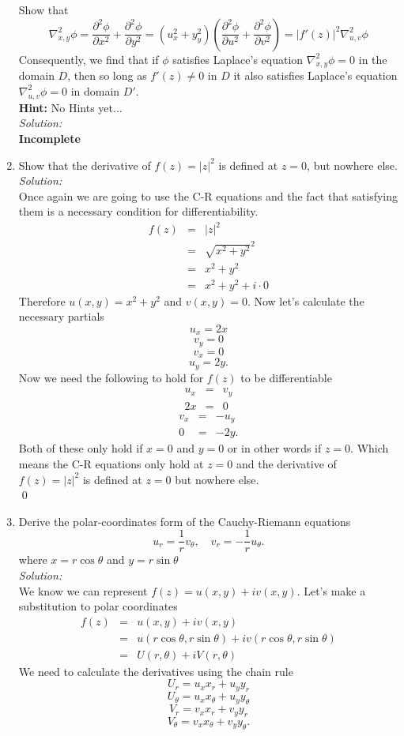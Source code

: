 \documentclass[10pt]{amsart}
\theoremstyle{nonumberplain}
\begin{document}
\begin{enumerate}[label={\bf {\arabic*}:}]
Show that
$$
\nabla_{x, y}^2 \phi = 
\frac{\partial^2\phi}{\partial x^2} + \frac{\partial^2 \phi }{\partial y^2} = 
\left(u_x^2 + y_y^2\right) \left(\frac{\partial^2\phi}{\partial u^2} + \frac{\partial^2 \phi }{\partial v^2}\right) =
\left| f'(z)\right|^2 \nabla_{u, v}^2 \phi
$$
Consequently, we find that if $\phi$ satisfies Laplace's equation $\nabla_{x, y}^2 \phi = 0$ in the domain $D$,
then so long as $f'(z) \neq 0$ in $D$ it also satisfies Laplace's equation $\nabla_{u, v}^2 \phi = 0$ in domain $D'$. \\
\textbf{Hint:} No Hints yet... \\
\textit{Solution:} \\
\textbf{Incomplete} \\
\item Show that the derivative of $f(z)=|z|^2$ is defined at $z=0$, but nowhere else.\\
\textit{Solution:} \\
Once again we are going to use the C-R equations and the fact that satisfying them is a necessary condition for differentiability.
\begin{eqnarray*}
f(z) &=&|z|^2 \\
      &=&\sqrt{x^2 + y^2}^2 \\
      &=& x^2 + y^2 \\
      &=& x^2 + y^2 + i \cdot 0
\end{eqnarray*}
Therefore $u(x, y) = x^2 + y^2$ and $v(x, y) = 0$. Now let's calculate the necessary partials
$$u_x = 2x$$ $$v_y = 0$$ $$v_x = 0$$ $$u_y = 2y.$$
Now we need the following to hold for $f(z)$ to be differentiable
\begin{eqnarray*}
u_x &=& v_y \\
2x &=& 0
\end{eqnarray*}
\begin{eqnarray*}
v_x &=& - u_y \\
0 &=& - 2y.
\end{eqnarray*}
Both of these only hold if $x=0$ and $y=0$ or in other words if $z=0$.
Which means the C-R equations only hold at $z=0$ and the derivative of $f(z) = |z|^2$ is defined at $z=0$ but nowhere else. \\
\qed

\item Derive the polar-coordinates form of the Cauchy-Riemann equations
$$
u_r=\frac{1}{r} v_\theta, \quad v_r=-\frac{1}{r} u_\theta.
$$
where $x=r \cos \theta$ and $y=r \sin \theta$ \\
\textit{Solution:} \\
We know we can represent $f(z) = u(x, y) + i v(x, y)$.
Let's make a substitution to polar coordinates
\begin{eqnarray*}
f(z) &=& u(x, y) + i v(x, y) \\
      &=& u(r \cos \theta, r \sin \theta) + i v(r \cos \theta, r \sin \theta) \\
      &=& U(r, \theta) + iV(r, \theta)
\end{eqnarray*}
We need to calculate the derivatives using the chain rule
$$U_r = u_xx_r + u_yy_r$$
$$U_\theta = u_xx_\theta + u_yy_\theta$$
$$V_r = v_xx_r + v_yy_r$$
$$V_\theta = v_xx_\theta + v_yy_\theta.$$


\end{enumerate}
\end{document}
